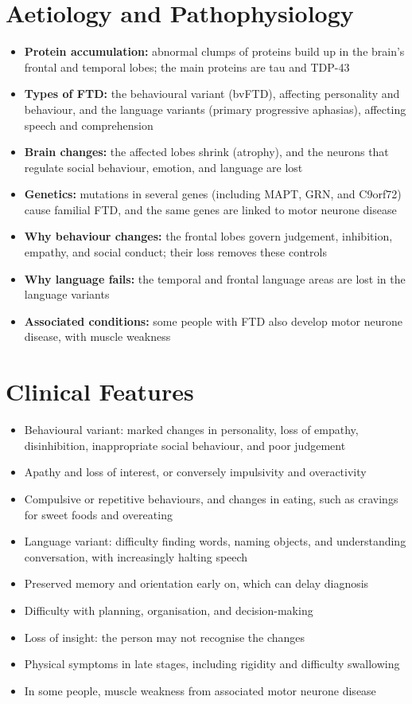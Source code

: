 \section*{Aetiology and Pathophysiology}
\begin{itemize}
    \item \textbf{Protein accumulation:} abnormal clumps of proteins build up in the brain's frontal and temporal lobes; the main proteins are tau and TDP-43
    \item \textbf{Types of FTD:} the behavioural variant (bvFTD), affecting personality and behaviour, and the language variants (primary progressive aphasias), affecting speech and comprehension
    \item \textbf{Brain changes:} the affected lobes shrink (atrophy), and the neurons that regulate social behaviour, emotion, and language are lost
    \item \textbf{Genetics:} mutations in several genes (including MAPT, GRN, and C9orf72) cause familial FTD, and the same genes are linked to motor neurone disease
    \item \textbf{Why behaviour changes:} the frontal lobes govern judgement, inhibition, empathy, and social conduct; their loss removes these controls
    \item \textbf{Why language fails:} the temporal and frontal language areas are lost in the language variants
    \item \textbf{Associated conditions:} some people with FTD also develop motor neurone disease, with muscle weakness
\end{itemize}

\section*{Clinical Features}
\begin{itemize}
    \item Behavioural variant: marked changes in personality, loss of empathy, disinhibition, inappropriate social behaviour, and poor judgement
    \item Apathy and loss of interest, or conversely impulsivity and overactivity
    \item Compulsive or repetitive behaviours, and changes in eating, such as cravings for sweet foods and overeating
    \item Language variant: difficulty finding words, naming objects, and understanding conversation, with increasingly halting speech
    \item Preserved memory and orientation early on, which can delay diagnosis
    \item Difficulty with planning, organisation, and decision-making
    \item Loss of insight: the person may not recognise the changes
    \item Physical symptoms in late stages, including rigidity and difficulty swallowing
    \item In some people, muscle weakness from associated motor neurone disease
\end{itemize}

